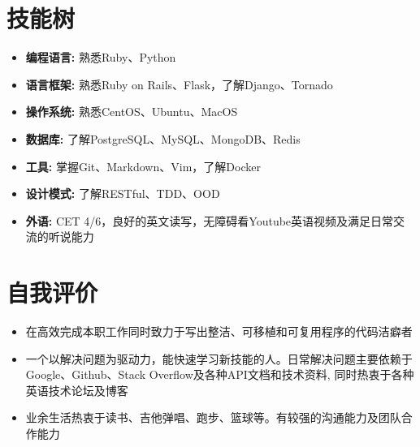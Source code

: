 \documentclass[11pt, a4paper,sans]{moderncv}   %
\begin{document}
\section{\yahei 技能树}
\begin{itemize}
  \item{\yahei \textbf{编程语言:} 熟悉Ruby、Python}
  \item{\yahei \textbf{语言框架:} 熟悉Ruby on Rails、Flask，了解Django、Tornado}
  \item{\yahei \textbf{操作系统:} 熟悉CentOS、Ubuntu、MacOS}
  \item{\yahei \textbf{数据库:} 了解PostgreSQL、MySQL、MongoDB、Redis}
  \item{\yahei \textbf{工具:} 掌握Git、Markdown、Vim，了解Docker}
  \item{\yahei \textbf{设计模式:} 了解RESTful、TDD、OOD}
  \item{\yahei \textbf{外语:} CET 4/6，良好的英文读写，无障碍看Youtube英语视频及满足日常交流的听说能力}
\end{itemize}
\vspace{-8pt}

\section{\yahei 自我评价}

\begin{itemize}
  \item{\yahei 在高效完成本职工作同时致力于写出整洁、可移植和可复用程序的代码洁癖者}
  \item{\yahei 一个以解决问题为驱动力，能快速学习新技能的人。日常解决问题主要依赖于Google、Github、Stack Overflow及各种API文档和技术资料, 同时热衷于各种英语技术论坛及博客}
  \item{\yahei 业余生活热衷于读书、吉他弹唱、跑步、篮球等。有较强的沟通能力及团队合作能力}
\end{itemize}
\end{document}
